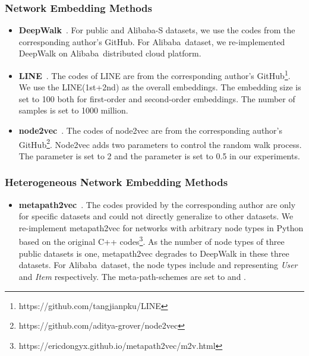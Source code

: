 \documentclass[sigconf]{acmart}
\newcommand{\company}{Alibaba}
\newcommand{\hide}[1]{} \newcommand{\jie}[1]{\textbf{\color{red}[(JT: #1 )]}}  \newcommand{\vpara}[1]{\vspace{0.07in}\noindent\textbf{#1 }}
\begin{document}
\subsubsection{Network Embedding Methods}
\begin{itemize}
  \item \textbf{DeepWalk}~\cite{perozzi2014deepwalk}. For public and \company-S datasets, we use the codes from the corresponding author's GitHub. For \company\ dataset, we re-implemented DeepWalk on \company\ distributed cloud platform. 
  \item \textbf{LINE}~\cite{tang2015line}. The codes of LINE are from the corresponding author's GitHub\footnote{https://github.com/tangjianpku/LINE}. We use the LINE(1st+2nd) as the overall embeddings. The embedding size is set to 100 both for first-order and second-order embeddings. The number of samples is set to 1000 million.
  \item \textbf{node2vec}~\cite{grover2016node2vec}. The codes of node2vec are from the corresponding author's GitHub\footnote{https://github.com/aditya-grover/node2vec}. Node2vec adds two parameters to control the random walk process. The parameter  is set to 2 and the parameter  is set to 0.5 in our experiments.
\end{itemize}

\subsubsection{Heterogeneous Network Embedding Methods}
\begin{itemize}
    \item \textbf{metapath2vec}~\cite{dong2017metapath2vec}. 
    The codes provided by the corresponding author are only for specific datasets and could not directly generalize to other datasets. We re-implement metapath2vec for networks with arbitrary node types in Python based on the original C++ codes\footnote{https://ericdongyx.github.io/metapath2vec/m2v.html}. As the number of node types of three public datasets is one, metapath2vec degrades to DeepWalk in these three datasets. For \company\ dataset, the node types include  and  representing \textit{User} and \textit{Item} respectively. The meta-path-schemes are set to  and . \hide{As the original code is tied to some certain categories and are difficult to run, we re-implemented it ourselves. }
\end{itemize}
\end{document}
